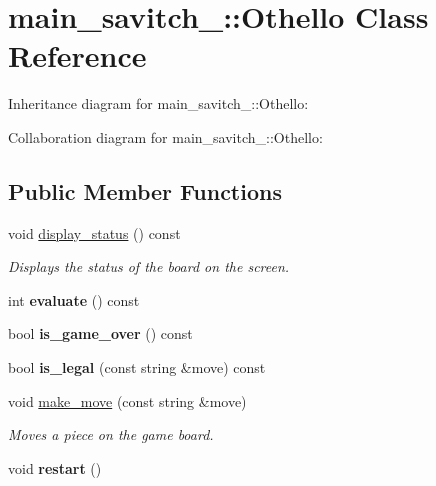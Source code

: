 \hypertarget{classmain__savitch__14_1_1Othello}{}\section{main\+\_\+savitch\+\_\+:\+:Othello Class Reference}
\label{classmain__savitch__14_1_1Othello}


Inheritance diagram for main\+\_\+savitch\+\_\+:\+:Othello\+:


Collaboration diagram for main\+\_\+savitch\+\_\+:\+:Othello\+:
\subsection*{Public Member Functions}
\begin{DoxyCompactItemize}
\item 
void \hyperlink{classmain__savitch__14_1_1Othello_a471f0e8f0e63ed32d764682f60110267}{display\+\_\+status} () const \hypertarget{classmain__savitch__14_1_1Othello_a471f0e8f0e63ed32d764682f60110267}{}\label{classmain__savitch__14_1_1Othello_a471f0e8f0e63ed32d764682f60110267}

\begin{DoxyCompactList}\small\item\em Displays the status of the board on the screen. \end{DoxyCompactList}\item 
int {\bfseries evaluate} () const \hypertarget{classmain__savitch__14_1_1Othello_a1b3239a14882cbc7e7bd44c0b6828514}{}\label{classmain__savitch__14_1_1Othello_a1b3239a14882cbc7e7bd44c0b6828514}

\item 
bool {\bfseries is\+\_\+game\+\_\+over} () const \hypertarget{classmain__savitch__14_1_1Othello_a4387d20f953aab54025760ec3f72f7ca}{}\label{classmain__savitch__14_1_1Othello_a4387d20f953aab54025760ec3f72f7ca}

\item 
bool {\bfseries is\+\_\+legal} (const string \&move) const \hypertarget{classmain__savitch__14_1_1Othello_ab4fb0040d5e1dbe34c33fa11a82285cf}{}\label{classmain__savitch__14_1_1Othello_ab4fb0040d5e1dbe34c33fa11a82285cf}

\item 
void \hyperlink{classmain__savitch__14_1_1Othello_a1066b280efa5cb41039585669282fe06}{make\+\_\+move} (const string \&move)
\begin{DoxyCompactList}\small\item\em Moves a piece on the game board. \end{DoxyCompactList}\item 
void {\bfseries restart} ()\hypertarget{classmain__savitch__14_1_1Othello_abf872b8074bfa4c04119317dc3b39af2}{}\label{classmain__savitch__14_1_1Othello_abf872b8074bfa4c04119317dc3b39af2}


\end{DoxyCompactItemize}
